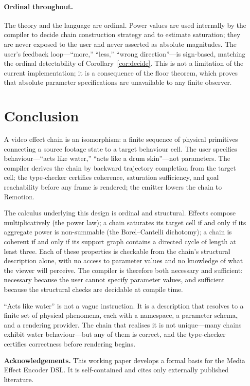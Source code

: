 \documentclass[twocolumn,11pt,a4paper]{article}
\theoremstyle{mee}
\theoremstyle{definition}
\theoremstyle{remark}
\begin{document}
\paragraph{Ordinal throughout.}
The theory and the language are ordinal. Power values are used internally
by the compiler to decide chain construction strategy and to estimate
saturation; they are never exposed to the user and never asserted as
absolute magnitudes. The user's feedback loop---``more,'' ``less,''
``wrong direction''---is sign-based, matching the ordinal detectability of
Corollary~\ref{cor:decide}. This is not a limitation of the current
implementation; it is a consequence of the floor theorem, which proves
that absolute parameter specifications are unavailable to any finite
observer.

\section{Conclusion}
\label{sec:conclusion}

A video effect chain is an isomorphism: a finite sequence of physical
primitives connecting a source footage state to a target behaviour cell.
The user specifies behaviour---``acts like water,'' ``acts like a drum
skin''---not parameters. The compiler derives the chain by backward
trajectory completion from the target cell; the type-checker certifies
coherence, saturation sufficiency, and goal reachability before any frame
is rendered; the emitter lowers the chain to Remotion.

The calculus underlying this design is ordinal and structural. Effects
compose multiplicatively (the power law); a chain saturates its target
cell if and only if its aggregate power is non-summable (the Borel--Cantelli
dichotomy); a chain is coherent if and only if its support graph contains
a directed cycle of length at least three. Each of these properties is
checkable from the chain's structural description alone, with no access to
parameter values and no knowledge of what the viewer will perceive. The
compiler is therefore both necessary and sufficient: necessary because the
user cannot specify parameter values, and sufficient because the
structural checks are decidable at compile time.

``Acts like water'' is not a vague instruction. It is a description that
resolves to a finite set of physical phenomena, each with a namespace, a
parameter schema, and a rendering provider. The chain that realises it is
not unique---many chains exhibit water behaviour---but any of them is
correct, and the type-checker certifies correctness before rendering
begins.

\bigskip
\noindent\textbf{Acknowledgements.} This working paper develops a formal
basis for the Media Effect Encoder DSL. It is self-contained and cites
only externally published literature.



\end{document}
